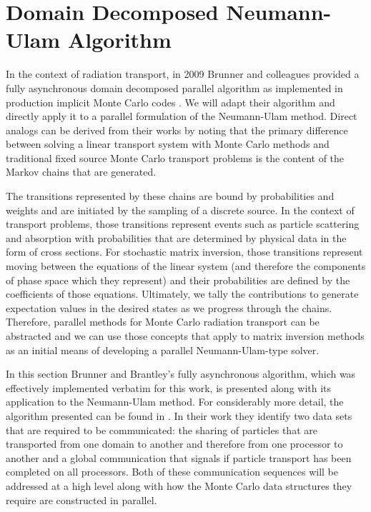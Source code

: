 \clearpage

\section{Domain Decomposed Neumann-Ulam Algorithm\ }
\label{sec:asynchronous_algorithm}
In the context of radiation transport, in 2009 Brunner and colleagues
provided a fully asynchronous domain decomposed parallel algorithm as
implemented in production implicit Monte Carlo codes
\citep{brunner_efficient_2009}. We will adapt their algorithm and
directly apply it to a parallel formulation of the Neumann-Ulam
method. Direct analogs can be derived from their works by noting that
the primary difference between solving a linear transport system with
Monte Carlo methods and traditional fixed source Monte Carlo transport
problems is the content of the Markov chains that are generated. 

The transitions represented by these chains are bound by probabilities
and weights and are initiated by the sampling of a discrete source. In
the context of transport problems, those transitions represent events
such as particle scattering and absorption with probabilities that are
determined by physical data in the form of cross sections. For
stochastic matrix inversion, those transitions represent moving
between the equations of the linear system (and therefore the
components of phase space which they represent) and their
probabilities are defined by the coefficients of those
equations. Ultimately, we tally the contributions to generate
expectation values in the desired states as we progress through the
chains. Therefore, parallel methods for Monte Carlo radiation
transport can be abstracted and we can use those concepts that apply
to matrix inversion methods as an initial means of developing a
parallel Neumann-Ulam-type solver.

In this section Brunner and Brantley's fully asynchronous algorithm,
which was effectively implemented verbatim for this work, is presented
along with its application to the Neumann-Ulam method. For
considerably more detail, the algorithm presented can be found in
\citep{brunner_efficient_2009}. In their work they identify two data
sets that are required to be communicated: the sharing of particles
that are transported from one domain to another and therefore from one
processor to another and a global communication that signals if
particle transport has been completed on all processors. Both of these
communication sequences will be addressed at a high level along with
how the Monte Carlo data structures they require are constructed in
parallel.

